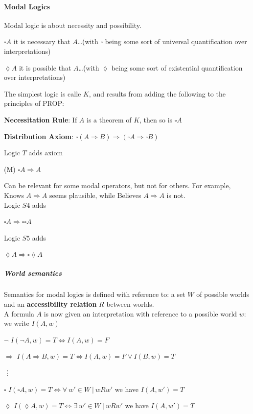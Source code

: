 \documentclass[10pt]{report}
\begin{document}
\paragraph{Modal Logics} Modal logic is about necessity and possibility.
\begin{list}{}{}
	\item $\square A$ it is necessary that $A$\ldots (with $\square$ being some sort of universal quantification over interpretations)
	\item $\lozenge A$ it is possible that $A$\ldots (with $\lozenge$ being some sort of existential quantification over interpretations)
\end{list}
The simplest logic is calle $K$, and results from adding the following to the principles of PROP:
\begin{list}{}{}
	\item \textbf{Necessitation Rule}: If $A$ is a theorem of $K$, then so is $\square A$
	\item \textbf{Distribution Axiom}: $\square (A\Rightarrow B) \Rightarrow (\square A \Rightarrow \square B)$
\end{list}
Logic $T$ adds axiom
\begin{list}{}{}
	\item[(M)] $\square A \Rightarrow A$
\end{list}
Can be relevant for some modal operators, but not for others. For example, Knows $A\Rightarrow A$ seems plausible, while Believes $A\Rightarrow A$ is not.\\
Logic $S4$ adds
\begin{list}{}{}
	\item $\square A \Rightarrow \square \square A$
\end{list}
Logic $S5$ adds
\begin{list}{}{}
	\item $\lozenge A \Rightarrow \square\lozenge A$
\end{list}
\subparagraph{World semantics} Semantics for modal logics is defined with reference to: a set $W$ of possible worlds and an \textbf{accessibility relation} $R$ between worlds.\\
A formula $A$ is now given an interpretation with reference to a possible world $w$: we write $I(A, w)$
\begin{list}{}{}
	\item[$\neg$] $I(\neg A, w)= T \Leftrightarrow I(A, w) = F$
	\item[$\Rightarrow$] $I(A\Rightarrow B, w)= T \Leftrightarrow I(A, w) = F\vee I(B, w) = T$
	\item[\vdots]
	\item[$\square$] $I(\square A, w)= T \Leftrightarrow\forall\:w'\in W\:|\: wRw'$ we have $I(A, w') = T$
	\item[$\lozenge$] $I(\lozenge A, w)= T \Leftrightarrow\exists\:w'\in W\:|\: wRw'$ we have $I(A, w') = T$
\end{list}
\end{document}
